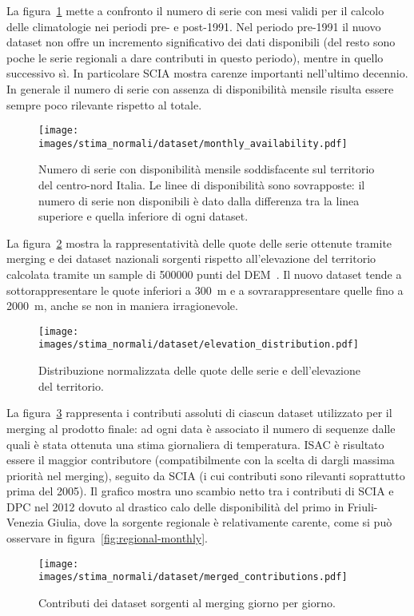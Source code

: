 La figura~\ref{fig:merged-timeseries} mette a confronto il numero di serie con mesi validi per il calcolo delle climatologie nei periodi pre- e post-1991. Nel periodo pre-1991 il nuovo dataset non offre un incremento significativo dei dati disponibili (del resto sono poche le serie regionali a dare contributi in questo periodo), mentre in quello successivo sì. In particolare SCIA mostra carenze importanti nell'ultimo decennio. In generale il numero di serie con assenza di disponibilità mensile risulta essere sempre poco rilevante rispetto al totale.
\begin{figure}[ht]
  \centering
  \texttt{[image: images/stima\_normali/dataset/monthly\_availability.pdf]}
  \caption{\small Numero di serie con disponibilità mensile soddisfacente sul territorio del centro-nord Italia. Le linee di disponibilità sono sovrapposte: il numero di serie non disponibili è dato dalla differenza tra la linea superiore e quella inferiore di ogni dataset.}\label{fig:merged-timeseries}
\end{figure}

La figura~\ref{fig:merged-elevations} mostra la rappresentatività delle quote delle serie ottenute tramite merging e dei dataset nazionali sorgenti rispetto all'elevazione del territorio calcolata tramite un sample di \num{500000} punti del DEM~\cite{europeanspaceagencyCopernicusGlobalEuropean2022}. Il nuovo dataset tende a sottorappresentare le quote inferiori a \qty{300}{\meter} e a sovrarappresentare quelle fino a \qty{2000}{\meter}, anche se non in maniera irragionevole.
\begin{figure}[ht]
  \centering
  \texttt{[image: images/stima\_normali/dataset/elevation\_distribution.pdf]}
  \caption{\small Distribuzione normalizzata delle quote delle serie e dell'elevazione del territorio.}\label{fig:merged-elevations}
\end{figure}

La figura~\ref{fig:merged-contributions} rappresenta i contributi assoluti di ciascun dataset utilizzato per il merging al prodotto finale: ad ogni data è associato il numero di sequenze dalle quali è stata ottenuta una stima giornaliera di temperatura. ISAC è risultato essere il maggior contributore (compatibilmente con la scelta di dargli massima priorità nel merging), seguito da SCIA (i cui contributi sono rilevanti soprattutto prima del 2005). Il grafico mostra uno scambio netto tra i contributi di SCIA e DPC nel 2012 dovuto al drastico calo delle disponibilità del primo in Friuli-Venezia Giulia, dove la sorgente regionale è relativamente carente, come si può osservare in figura~\ref{fig:regional-monthly}.
\begin{figure}[ht]
  \centering
  \texttt{[image: images/stima\_normali/dataset/merged\_contributions.pdf]}
  \caption{\small Contributi dei dataset sorgenti al merging giorno per giorno.}\label{fig:merged-contributions}
\end{figure}

